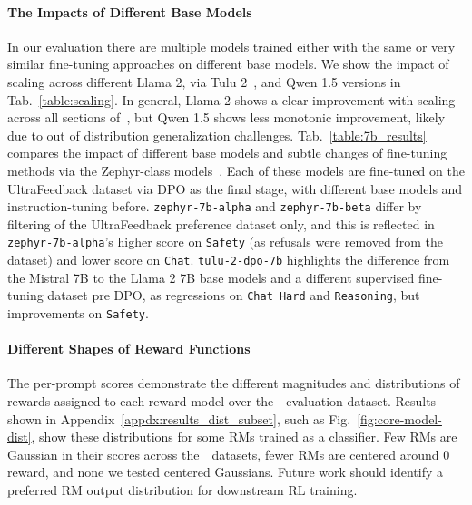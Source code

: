 \paragraph{The Impacts of Different Base Models}
In our evaluation there are multiple models trained either with the same or very similar fine-tuning approaches on different base models.
We show the impact of scaling across different Llama 2, via Tulu 2~\citep{ivison2023camels}, and Qwen 1.5 versions in Tab.~\ref{table:scaling}.
In general,  
Llama 2 shows a clear improvement with scaling across all sections of~\name, but Qwen 1.5 shows less monotonic improvement, likely due to out of distribution generalization challenges.
Tab.~\ref{table:7b_results} compares the impact of different base models and subtle changes of fine-tuning methods via the Zephyr-class models~\citep{tunstall2023zephyr}.
Each of these models are fine-tuned on the UltraFeedback dataset via DPO as the final stage, with different base models and instruction-tuning before.
\texttt{zephyr-7b-alpha} and \texttt{zephyr-7b-beta} differ by filtering of the UltraFeedback preference dataset only, and this is reflected in \texttt{zephyr-7b-alpha}'s higher score on \texttt{Safety} (as refusals were removed from the dataset) and lower score on \texttt{Chat}.
\texttt{tulu-2-dpo-7b} highlights the difference from the Mistral 7B to the Llama 2 7B base models and a different supervised fine-tuning dataset pre DPO, as regressions on \texttt{Chat Hard} and \texttt{Reasoning}, but improvements on \texttt{Safety}.



\paragraph{Different Shapes of Reward Functions}%
The per-prompt scores demonstrate the different magnitudes and distributions of rewards assigned to each reward model over the~\name~evaluation dataset.
Results shown in Appendix~\ref{appdx:results_dist_subset}, such as Fig.~\ref{fig:core-model-dist}, show these distributions for some RMs trained as a classifier.
Few RMs are Gaussian in their scores across the~\name~datasets, fewer RMs are centered around 0 reward, and none we tested centered Gaussians.
Future work should identify a preferred RM output distribution for downstream RL training.

